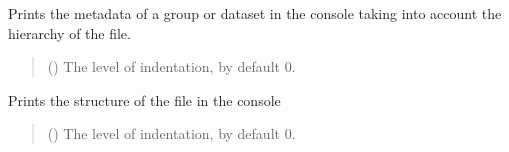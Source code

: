 \documentclass[letterpaper,10pt,english]{sphinxmanual}
\begin{document}
\begin{fulllineitems}
\begin{fulllineitems}
\label{\detokenize{source/HDF5_BLS:HDF5_BLS.wrapper.Wrapper.print_metadata}}
\pysigstartsignatures
\pysiglinewithargsret
{}
{}
{}
\pysigstopsignatures
\sphinxAtStartPar
Prints the metadata of a group or dataset in the console taking into account the hierarchy of the file.
\begin{quote}\begin{description}
\sphinxAtStartPar
{} (\sphinxstyleliteralemphasis{\sphinxupquote{, }}) \textendash{} The level of indentation, by default 0.

\end{description}\end{quote}

\end{fulllineitems}


\begin{fulllineitems}
\label{\detokenize{source/HDF5_BLS:HDF5_BLS.wrapper.Wrapper.print_structure}}
\pysigstartsignatures
\pysiglinewithargsret
{}
{}
{}
\pysigstopsignatures
\sphinxAtStartPar
Prints the structure of the file in the console
\begin{quote}\begin{description}
\sphinxAtStartPar
{} (\sphinxstyleliteralemphasis{\sphinxupquote{, }}) \textendash{} The level of indentation, by default 0.

\end{description}\end{quote}

\end{fulllineitems}



\end{fulllineitems}
\end{document}
